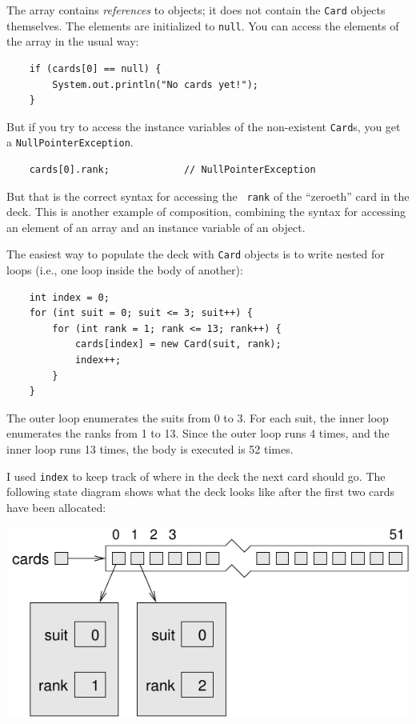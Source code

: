 \documentclass[12pt]{book}
\theoremstyle{exercise}
\begin{document}
The array contains
{\em references} to objects; it does not contain the
{\tt Card} objects themselves.  The elements are
initialized to {\tt null}.  You can access the elements of
the array in the usual way:

\begin{lstlisting}
    if (cards[0] == null) {
        System.out.println("No cards yet!");
    }
\end{lstlisting}
%
But if you try to access the instance variables of the
non-existent {\tt Card}s, you get a {\tt NullPointerException}.

\begin{lstlisting}
    cards[0].rank;             // NullPointerException
\end{lstlisting}
%
But that is the correct syntax for accessing the {\tt
rank} of the ``zeroeth'' card in the deck.  This is another example of
  composition, combining the syntax for accessing an element
  of an array and an instance variable of an object.


The easiest way to populate the deck with {\tt Card} objects
is to write nested for loops (i.e., one loop inside the body of another):

\begin{lstlisting}
    int index = 0;
    for (int suit = 0; suit <= 3; suit++) {
        for (int rank = 1; rank <= 13; rank++) {
            cards[index] = new Card(suit, rank);
            index++;
        }
    }
\end{lstlisting}
%
The outer loop enumerates the suits from 0 to 3.  For
each suit, the inner loop enumerates the ranks from 1
to 13.  Since the outer loop runs 4 times, and
the inner loop runs 13 times,
the body is executed is 52 times.


I used {\tt index} to keep track of where in the
deck the next card should go.  The following state diagram
shows what the deck looks like after the first two cards
have been allocated:

\includegraphics{figs/cardarray2.pdf}
\end{document}
